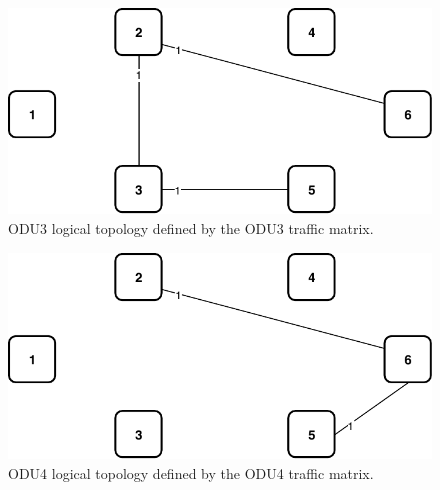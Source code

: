\begin{figure}[h!]
\centering
\includegraphics[width=12cm]{sdf/ilp/translucent_protection/figures/logical_topology_ODU3_low}
\caption{ODU3 logical topology defined by the ODU3 traffic matrix.}
\label{logical3_ODU3_protectionlow}
\end{figure}

\begin{figure}[h!]
\centering
\includegraphics[width=12cm]{sdf/ilp/translucent_protection/figures/logical_topology_ODU4_low}
\caption{ODU4 logical topology defined by the ODU4 traffic matrix.}
\label{logical3_ODU4_protectionlow}
\end{figure}


